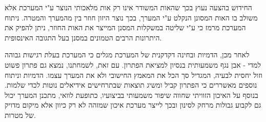 החידוש בהצעה נעוץ בכך שהאות המשודר אינו רק אות מלאכותי הנוצר ע"י המערכת אלא משולב בו האות המסונן הנקלט ע"י המערך, בכך נוצר היזון חוזר בין מהמערך והמטרה.
ניתוח המערכת מרמז כי ע"י שליטה במשקלות המסנן המייצר את האות החוזר, ניתן להפיק את היתרונות הרבים הטמונים במסנן בעל התגובה האינסופית.
\par
לאחר מכן, הדמיות ובחינה דקדקנית של המערכת מגלים כי המערכת בעלת רגישות גבוהה למדי - אבן נגף משמעותית בנסיון למציאת הפתרון.
עם זאת, לשמחתנו, נמצא גם פתרון פשוט וזול יחסית לבעיה, המגדיל סך הכל את המאמץ החישובי ולא את המערך עצמו.
הדמיות וניתוח נוספים מאשררים כי הפתרון קביל ומשיג תוצאות שבתרחישים אידיאלים נוטות לכדי שלמות.
בנוסף על האיכון הזוויתי שחווה שיפור משמעותי בביצועיו, כתופעת לוואי, מתכנן המערך יכול גם לקבוע גבולות מרחק לסינון ובכך לייצר מערכת איכון שמזהה לא רק כיוון אלא מיקום מדויק של מטרות.

